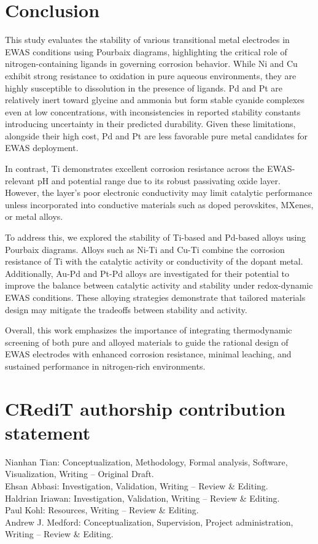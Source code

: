 \documentclass[journal=jacsat,manuscript=article]{achemso}
\begin{document}
\section{Conclusion}

This study evaluates the stability of various transitional metal electrodes in EWAS conditions using Pourbaix diagrams, highlighting the critical role of nitrogen-containing ligands in governing corrosion behavior. While Ni and Cu exhibit strong resistance to oxidation in pure aqueous environments, they are highly susceptible to dissolution in the presence of  ligands. Pd and Pt are relatively inert toward glycine and ammonia but form stable cyanide complexes even at low concentrations, with inconsistencies in reported stability constants introducing uncertainty in their predicted durability. Given these limitations, alongside their high cost, Pd and Pt are less favorable pure metal candidates for EWAS deployment.

In contrast, Ti demonstrates excellent corrosion resistance across the EWAS-relevant pH and potential range due to its robust passivating oxide layer. However, the  layer's poor electronic conductivity may limit catalytic performance unless incorporated into conductive materials such as doped perovskites, MXenes, or metal alloys.

To address this, we explored the stability of Ti-based and Pd-based alloys using Pourbaix diagrams. Alloys such as Ni-Ti and Cu-Ti combine the corrosion resistance of Ti with the catalytic activity or conductivity of the dopant metal. Additionally, Au-Pd and Pt-Pd alloys are investigated for their potential to improve the balance between catalytic activity and stability under redox-dynamic EWAS conditions. These alloying strategies demonstrate that tailored materials design may mitigate the tradeoffs between stability and activity.

Overall, this work emphasizes the importance of integrating thermodynamic screening of both pure and alloyed materials to guide the rational design of EWAS electrodes with enhanced corrosion resistance, minimal leaching, and sustained performance in nitrogen-rich environments.


\section{CRediT authorship contribution statement}
Nianhan Tian: Conceptualization, Methodology, Formal analysis, Software, Visualization, Writing – Original Draft.  \\
Ehsan Abbasi: Investigation, Validation, Writing – Review \& Editing.  \\
Haldrian Iriawan: Investigation, Validation, Writing – Review \& Editing.  \\
Paul Kohl: Resources, Writing – Review \& Editing.  \\
Andrew J. Medford: Conceptualization, Supervision, Project administration, Writing – Review \& Editing.\\
\end{document}
